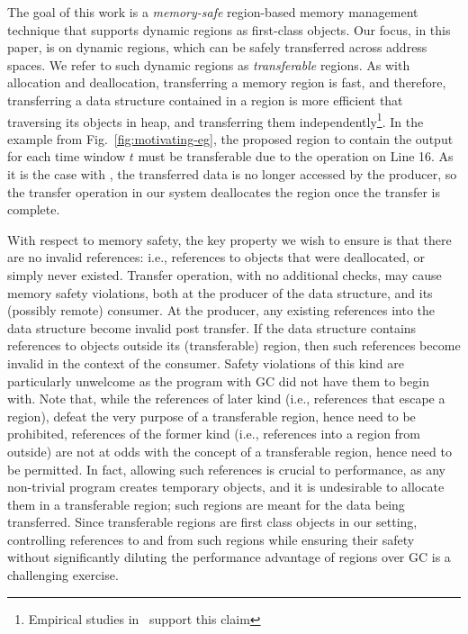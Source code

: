 The goal of this work is a \emph{memory-safe} region-based memory
management technique that supports dynamic regions as first-class
objects. Our focus, in this paper, is on dynamic regions, which can be
safely transferred across address spaces. We refer to such dynamic
regions as \emph{transferable} regions. As with allocation and
deallocation, transferring a memory region is fast, and therefore,
transferring a data structure contained in a region is more efficient
that traversing its objects in heap, and transferring them
independently\footnote{Empirical studies in~\cite{Broom:HotOS} support
this claim}. In the  example from
Fig.~\ref{fig:motivating-eg}, the proposed region to contain the
output for each time window $t$ must be transferable due to the
 operation on Line 16. As it is the case with
, the transferred data is no longer accessed by the
producer, so the transfer operation in our system deallocates the
region once the transfer is complete.

With respect to memory safety, the key property we wish to ensure is
that there are no invalid references: i.e., references to objects that
were deallocated, or simply never existed. Transfer operation, with no
additional checks, may cause memory safety violations, both at the
producer of the data structure, and its (possibly remote) consumer. At
the producer, any existing references into the data structure become
invalid post transfer. If the data structure contains references to
objects outside its (transferable) region, then such references become
invalid in the context of the consumer. Safety violations of this kind
are particularly unwelcome as the program with GC did not have them to
begin with. Note that, while the references of later kind (i.e.,
references that escape a region), defeat the very purpose of a
transferable region, hence need to be prohibited, references of the
former kind (i.e., references into a region from outside) are not at
odds with the concept of a transferable region, hence need to be
permitted. In fact, allowing such references is crucial to
performance, as any non-trivial program creates temporary objects, and
it is undesirable to allocate them in a transferable region; such
regions are meant for the data being transferred. Since transferable
regions are first class objects in our setting, controlling references
to and from such regions while ensuring their safety without
significantly diluting the performance advantage of regions over GC is
a challenging exercise.

